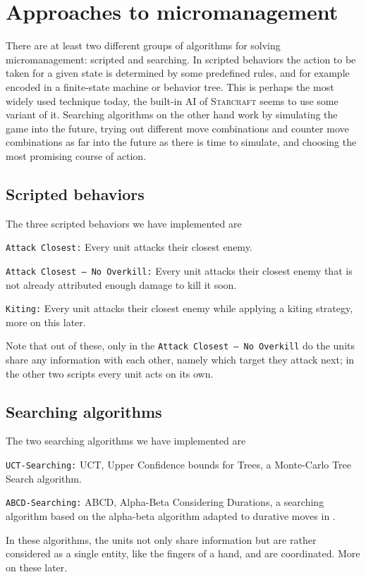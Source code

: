 \section{Approaches to micromanagement}
There are at least two different groups of algorithms for solving micromanagement: scripted and searching.
In scripted behaviors the action to be taken for a given state is determined by some predefined rules, and for example encoded in a finite-state machine or behavior tree.
This is perhaps the most widely used technique today, the built-in AI of \textsc{Starcraft} seems to use some variant of it.
Searching algorithms on the other hand work by simulating the game into the future, trying out different move combinations and counter move combinations as far into the future as there is time to simulate, and choosing the most promising course of action.

\subsection{Scripted behaviors}
The three scripted behaviors we have implemented are
\begin{shortitem}
\item \texttt{Attack Closest:}					Every unit attacks their closest enemy.
\item \texttt{Attack Closest -- No Overkill:}	Every unit attacks their closest enemy that is not already attributed enough damage to kill it soon.
\item \texttt{Kiting:}							Every unit attacks their closest enemy while applying a kiting strategy, more on this later.
\end{shortitem}

Note that out of these, only in the \texttt{Attack Closest -- No Overkill} do the units share any information with each other, namely which target they attack next; in the other two scripts every unit acts on its own.

\subsection {Searching algorithms}
The two searching algorithms we have implemented are
\begin{shortitem}
\item \texttt{UCT-Searching:}	UCT, Upper Confidence bounds for Trees, a Monte-Carlo Tree Search algorithm.
\item \texttt{ABCD-Searching:}	ABCD, Alpha-Beta Considering Durations, a searching algorithm based on the alpha-beta algorithm adapted to durative moves in \cite{abcd}.
\end{shortitem}
In these algorithms, the units not only share information but are rather considered as a single entity, like the fingers of a hand, and are coordinated.
More on these later.
